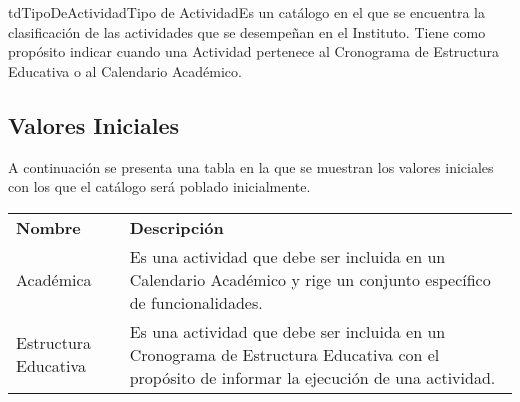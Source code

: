 \begin{TipoDeDato}{tdTipoDeActividad}{Tipo de Actividad}{Es un catálogo en el que se encuentra la clasificación de las actividades que se desempeñan en el Instituto. Tiene como propósito indicar cuando una Actividad pertenece al Cronograma de Estructura Educativa o al Calendario Académico.}

	\begin{tdAtributos}
	
		
	
	\end{tdAtributos}

	\subsection{Valores Iniciales}
	 A continuación se presenta una tabla en la que se muestran los valores iniciales con los que el catálogo será poblado inicialmente.\cdtEmpty
	\begin{longtable}{|p{}| p{}}
				\hline
				\rowcolor{colorPrincipal}
	 			\multicolumn{2}{c}{\bf \color{white} Valores Iniciales}\\
	 			\hline
	 			\rowcolor{colorSecundario}
	 			\bf\color{white}Nombre &  \bf \color{white} Descripción\\
	 			\hline
	 			Académica & Es una actividad que debe ser incluida en un Calendario Académico y rige un conjunto específico de funcionalidades.\\
	 			\hline
	 			Estructura Educativa & Es una actividad que debe ser incluida en un Cronograma de Estructura Educativa con el propósito de informar la ejecución de una actividad.\\
	 			\hline
		\end{longtable}
\end{TipoDeDato}